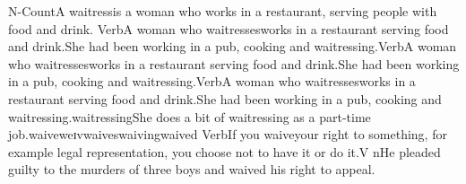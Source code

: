  \firstoftypegrammarcategorylastoftypesensearticlesectionletter N-Count A \firstoftypelastoftypewordusedefinitionfirstoftypelastoftypesensearticlesectionletter waitress  is a woman who works in a restaurant, serving people with food and drink. \firstoftypegrammarcategorylastoftypesensearticlesectionletter Verb A woman who \firstoftypelastoftypewordusedefinitionfirstoftypelastoftypesensearticlesectionletter waitresses  works in a restaurant serving food and drink.\examplesensearticlesectionletter She had been working in a pub, cooking and waitressing.\firstoftypegrammarcategorylastoftypesensearticlesectionletter Verb A woman who \firstoftypelastoftypewordusedefinitionfirstoftypelastoftypesensearticlesectionletter waitresses  works in a restaurant serving food and drink.\examplesensearticlesectionletter She had been working in a pub, cooking and waitressing.\firstoftypegrammarcategorylastoftypesensearticlesectionletter Verb A woman who \firstoftypelastoftypewordusedefinitionfirstoftypelastoftypesensearticlesectionletter waitresses  works in a restaurant serving food and drink.\examplesensearticlesectionletter She had been working in a pub, cooking and waitressing.\firstoftypeheadwordlastoftypefirstoftypelastoftypesubentryarticlesectionletter wait\firstoftypeheadwordlastoftypefirstoftypelastoftypesubentryarticlesectionletter ress\firstoftypeheadwordlastoftypefirstoftypelastoftypesubentryarticlesectionletter ing\examplefirstoftypelastoftypesubentryarticlesectionletter She does a bit of waitressing as a part-time job.\firstoftypeheadwordlastoftypearticlesectionletter waive\firstoftypelastoftypepronunciationarticlesectionletter w\firstoftypelastoftypestressfirstoftypelastoftypepronunciationarticlesectionletter eɪ\firstoftypelastoftypepronunciationarticlesectionletter v\firstoftypevariantinflectionarticlesectionletter waives\variantinflectionarticlesectionletter waiving\lastoftypevariantinflectionarticlesectionletter waived \firstoftypegrammarcategorylastoftypesensearticlesectionletter Verb If you \firstoftypelastoftypewordusedefinitionfirstoftypelastoftypesensearticlesectionletter waive  your right to something, for example legal representation, you choose not to have it or do it.\exampleusefirstoftypelastoftypesensearticlesectionletter V n\examplesensearticlesectionletter He pleaded guilty to the murders of three boys and waived his right to appeal. \firstoftypegrammarcategorylastoftypesensearticlesectionletter 